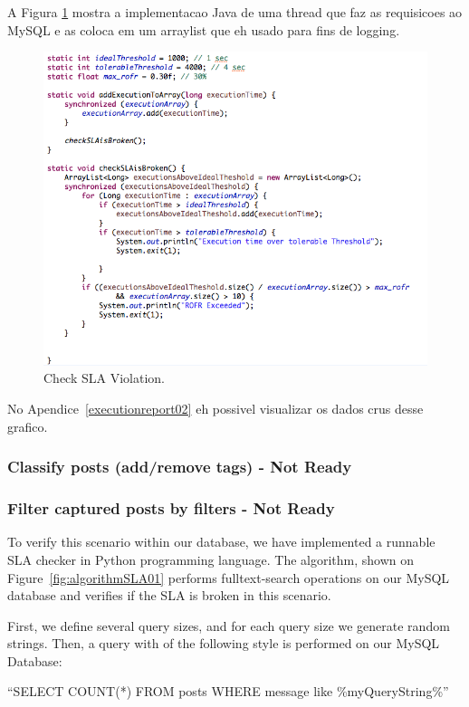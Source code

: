 A Figura \ref{fig:sla_check} mostra a implementacao Java de uma thread que faz as requisicoes ao MySQL e as coloca em um arraylist que eh usado para fins de logging.

\begin{figure}[ht!]
\centering
\includegraphics[width=120mm]{Imagens/check_sla.png}
\caption{Check SLA Violation.\label{fig:sla_check}}
\end{figure}

No Apendice~\ref{executionreport02} eh possivel visualizar os dados crus desse grafico. 

\subsubsection{Classify posts (add/remove tags) - Not Ready}


\subsubsection{Filter captured posts by filters - Not Ready}

To verify this scenario within our database, we have implemented a runnable SLA checker in Python programming language. The algorithm, shown on Figure~\ref{fig:algorithmSLA01} performs fulltext-search operations on our MySQL database and verifies if the SLA is broken in this scenario. 

First, we define several query sizes, and for each query size we generate random strings. Then, a query with of the following style is performed on our MySQL Database: 

 ``SELECT COUNT(*) FROM posts WHERE message like \%myQueryString\%''

